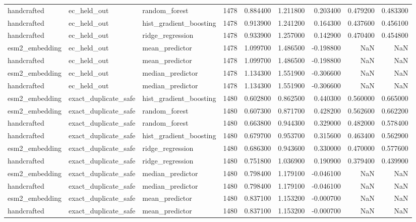 \begin{longtable}{lllrrrrrr}
handcrafted & ec\_held\_out & random\_forest & 1478 & 0.884400 & 1.211800 & 0.203400 & 0.479200 & 0.483300 \\
handcrafted & ec\_held\_out & hist\_gradient\_boosting & 1478 & 0.913900 & 1.241200 & 0.164300 & 0.437600 & 0.456100 \\
handcrafted & ec\_held\_out & ridge\_regression & 1478 & 0.933900 & 1.257000 & 0.142900 & 0.470400 & 0.454800 \\
esm2\_embedding & ec\_held\_out & mean\_predictor & 1478 & 1.099700 & 1.486500 & -0.198800 & NaN & NaN \\
handcrafted & ec\_held\_out & mean\_predictor & 1478 & 1.099700 & 1.486500 & -0.198800 & NaN & NaN \\
esm2\_embedding & ec\_held\_out & median\_predictor & 1478 & 1.134300 & 1.551900 & -0.306600 & NaN & NaN \\
handcrafted & ec\_held\_out & median\_predictor & 1478 & 1.134300 & 1.551900 & -0.306600 & NaN & NaN \\
esm2\_embedding & exact\_duplicate\_safe & hist\_gradient\_boosting & 1480 & 0.602800 & 0.862500 & 0.440300 & 0.560000 & 0.665000 \\
esm2\_embedding & exact\_duplicate\_safe & random\_forest & 1480 & 0.607300 & 0.871700 & 0.428200 & 0.562600 & 0.662200 \\
handcrafted & exact\_duplicate\_safe & random\_forest & 1480 & 0.663800 & 0.944300 & 0.329000 & 0.482000 & 0.578400 \\
handcrafted & exact\_duplicate\_safe & hist\_gradient\_boosting & 1480 & 0.679700 & 0.953700 & 0.315600 & 0.463400 & 0.562900 \\
esm2\_embedding & exact\_duplicate\_safe & ridge\_regression & 1480 & 0.686300 & 0.943600 & 0.330000 & 0.470000 & 0.577600 \\
handcrafted & exact\_duplicate\_safe & ridge\_regression & 1480 & 0.751800 & 1.036900 & 0.190900 & 0.379400 & 0.439900 \\
esm2\_embedding & exact\_duplicate\_safe & median\_predictor & 1480 & 0.798400 & 1.179100 & -0.046100 & NaN & NaN \\
handcrafted & exact\_duplicate\_safe & median\_predictor & 1480 & 0.798400 & 1.179100 & -0.046100 & NaN & NaN \\
esm2\_embedding & exact\_duplicate\_safe & mean\_predictor & 1480 & 0.837100 & 1.153200 & -0.000700 & NaN & NaN \\
handcrafted & exact\_duplicate\_safe & mean\_predictor & 1480 & 0.837100 & 1.153200 & -0.000700 & NaN & NaN \\

\end{longtable}
